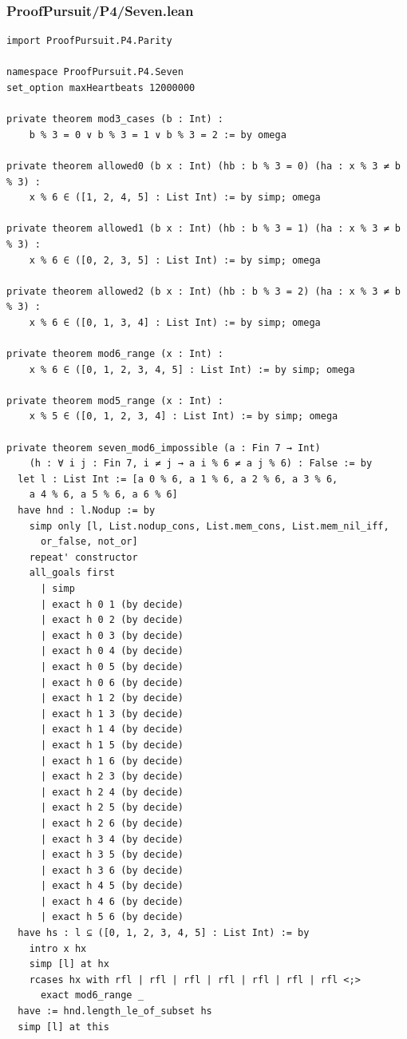 \documentclass[11pt,a4paper]{article}
\begin{document}
\subsubsection{ProofPursuit/P4/Seven.lean}\label{proofpursuitp4seven.lean}

\begin{Verbatim}[breaklines,breakanywhere,fontsize=\footnotesize]
import ProofPursuit.P4.Parity

namespace ProofPursuit.P4.Seven
set_option maxHeartbeats 12000000

private theorem mod3_cases (b : Int) :
    b % 3 = 0 ∨ b % 3 = 1 ∨ b % 3 = 2 := by omega

private theorem allowed0 (b x : Int) (hb : b % 3 = 0) (ha : x % 3 ≠ b % 3) :
    x % 6 ∈ ([1, 2, 4, 5] : List Int) := by simp; omega

private theorem allowed1 (b x : Int) (hb : b % 3 = 1) (ha : x % 3 ≠ b % 3) :
    x % 6 ∈ ([0, 2, 3, 5] : List Int) := by simp; omega

private theorem allowed2 (b x : Int) (hb : b % 3 = 2) (ha : x % 3 ≠ b % 3) :
    x % 6 ∈ ([0, 1, 3, 4] : List Int) := by simp; omega

private theorem mod6_range (x : Int) :
    x % 6 ∈ ([0, 1, 2, 3, 4, 5] : List Int) := by simp; omega

private theorem mod5_range (x : Int) :
    x % 5 ∈ ([0, 1, 2, 3, 4] : List Int) := by simp; omega

private theorem seven_mod6_impossible (a : Fin 7 → Int)
    (h : ∀ i j : Fin 7, i ≠ j → a i % 6 ≠ a j % 6) : False := by
  let l : List Int := [a 0 % 6, a 1 % 6, a 2 % 6, a 3 % 6,
    a 4 % 6, a 5 % 6, a 6 % 6]
  have hnd : l.Nodup := by
    simp only [l, List.nodup_cons, List.mem_cons, List.mem_nil_iff,
      or_false, not_or]
    repeat' constructor
    all_goals first
      | simp
      | exact h 0 1 (by decide)
      | exact h 0 2 (by decide)
      | exact h 0 3 (by decide)
      | exact h 0 4 (by decide)
      | exact h 0 5 (by decide)
      | exact h 0 6 (by decide)
      | exact h 1 2 (by decide)
      | exact h 1 3 (by decide)
      | exact h 1 4 (by decide)
      | exact h 1 5 (by decide)
      | exact h 1 6 (by decide)
      | exact h 2 3 (by decide)
      | exact h 2 4 (by decide)
      | exact h 2 5 (by decide)
      | exact h 2 6 (by decide)
      | exact h 3 4 (by decide)
      | exact h 3 5 (by decide)
      | exact h 3 6 (by decide)
      | exact h 4 5 (by decide)
      | exact h 4 6 (by decide)
      | exact h 5 6 (by decide)
  have hs : l ⊆ ([0, 1, 2, 3, 4, 5] : List Int) := by
    intro x hx
    simp [l] at hx
    rcases hx with rfl | rfl | rfl | rfl | rfl | rfl | rfl <;>
      exact mod6_range _
  have := hnd.length_le_of_subset hs
  simp [l] at this


\end{Verbatim}
\end{document}
